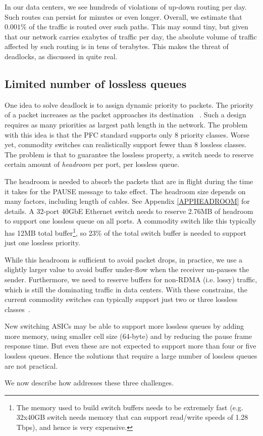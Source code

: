 In our data centers, we see hundreds of violations of up-down routing per
day. Such routes can persist for minutes or even longer. Overall, we estimate
that $0.001\%$ of the traffic is routed over such paths. This may sound tiny,
but given that our network carries exabytes of traffic per day, the absolute
volume of traffic affected by such routing is in tens of terabytes. This makes
the threat of deadlocks, as discussed
in\cite{rdmaatscale,shpiner2016unlocking,hu2016deadlocks} quite real.

\subsection{Limited number of lossless queues}
\label{subsec:pfcheadroom}

One idea to solve deadlock is to assign dynamic priority to packets. The
priority of a packet increases as the packet approaches its destination
~\cite{karol2003prevention}.  Such a design requires as many priorities as largest 
path length in the network.  The problem with this idea is that the PFC standard
supports only 8 priority classes. Worse yet, commodity switches can
realistically support fewer than 8 lossless classes.  The problem is that  to
guarantee the lossless property, a switch needs to reserve certain amount of
{\it headroom} per port, per lossless queue.

The headroom is needed to absorb the packets that are in flight during the time
it takes for the PAUSE message to take effect.
The headroom size depends on many factors, including length
of cables. See Appendix \ref{APPHEADROOM} for details.  A
32-port 40GbE Ethernet switch needs to reserve 2.76MB of headroom to support one
lossless queue on all ports. A commodity switch like this typically has
12MB total buffer\footnote{The memory used to build switch buffers needs to be
extremely fast (e.g. 32x40GB switch needs memory that can support read/write
speeds of 1.28 Tbps), and hence is very expensive.}, so 23\%
of the total switch buffer is needed to support just one lossless priority.

While this headroom is sufficient to avoid packet drops, in practice, we use a
slightly larger value to avoid buffer under-flow when the receiver un-pauses the
sender.  Furthermore, we need to reserve buffers for non-RDMA (i.e. lossy)
traffic, which is still the dominating traffic in data centers. With these
constrains, the current commodity switches can typically support just two or
three lossless classes~\cite{rdmaatscale}.

New switching ASICs may be able to support more lossless queues by adding more
memory, using smaller cell size (64-byte) and by reducing the pause frame
response time. But even these are not expected to support more than four or five
lossless queues. Hence the solutions that require a large number of lossless
queues are not practical.

We now describe how \sysname{} addresses these three challenges.
